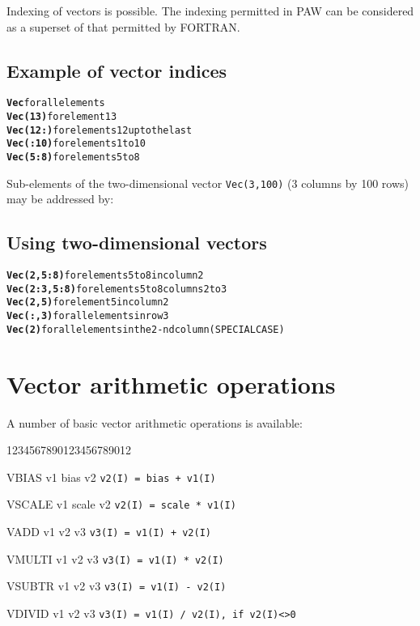 Indexing of vectors is possible. The 
indexing permitted in PAW can be considered as a superset
of that permitted by FORTRAN.

\subsection*{Example of vector indices}
\begin{alltt}
{\bf Vec}            for all elements
{\bf Vec(13)}        for element 13
{\bf Vec(12:)}       for elements 12 up to the last
{\bf Vec(:10)}       for elements 1 to 10
{\bf Vec(5:8)}       for elements 5 to 8
\end{alltt}

Sub-elements of the two-dimensional vector \texttt{Vec(3,100)}
(3 columns by 100 rows) may be addressed by:

\subsection*{Using two-dimensional vectors}
\begin{alltt}
{\bf Vec(2,5:8)}     for elements 5 to 8 in column 2
{\bf Vec(2:3,5:8)}   for elements 5 to 8 columns 2 to 3
{\bf Vec(2,5)}       for element 5 in column 2
{\bf Vec(:,3)}       for all elements in row 3
{\bf Vec(2)}         for all elements in the 2-nd column (SPECIAL CASE)
\end{alltt}

\section{Vector arithmetic operations}
 
A number of basic vector arithmetic operations is available:

\begin{DLtt}{1234567890123456789012}
\item[VBIAS     v1 bias v2]   \texttt{v2(I) = bias + v1(I)}
\item[VSCALE    v1 scale v2]  \texttt{v2(I) = scale * v1(I)}
\item[VADD      v1 v2 v3]     \texttt{v3(I) = v1(I) + v2(I)}
\item[VMULTI    v1 v2 v3]     \texttt{v3(I) = v1(I) * v2(I)}
\item[VSUBTR    v1 v2 v3]     \texttt{v3(I) = v1(I) - v2(I)}
\item[VDIVID    v1 v2 v3]     \texttt{v3(I) = v1(I) / v2(I), if v2(I)<>0}
\end{DLtt}
 
